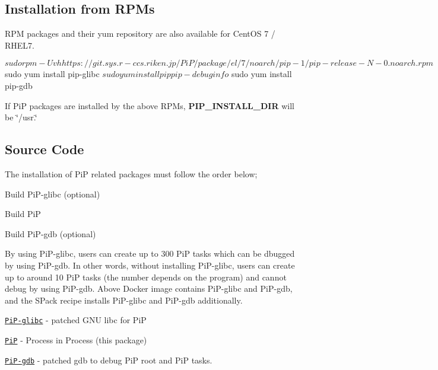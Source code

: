 \subsection*{Installation from R\-P\-Ms}

R\-P\-M packages and their yum repository are also available for Cent\-O\-S 7 / R\-H\-E\-L7. \begin{DoxyVerb}$ sudo rpm -Uvh https://git.sys.r-ccs.riken.jp/PiP/package/el/7/noarch/pip-1/pip-release-N-0.noarch.rpm
$ sudo yum install pip-glibc
$ sudo yum install pip pip-debuginfo
$ sudo yum install pip-gdb
\end{DoxyVerb}


If Pi\-P packages are installed by the above R\-P\-Ms, {\bfseries P\-I\-P\-\_\-\-I\-N\-S\-T\-A\-L\-L\-\_\-\-D\-I\-R} will be \char`\"{}/usr.\char`\"{}

\subsection*{Source Code}

The installation of Pi\-P related packages must follow the order below;


\begin{DoxyEnumerate}
\item Build Pi\-P-\/glibc (optional)
\item Build Pi\-P
\item Build Pi\-P-\/gdb (optional)
\end{DoxyEnumerate}

By using Pi\-P-\/glibc, users can create up to 300 Pi\-P tasks which can be dbugged by using Pi\-P-\/gdb. In other words, without installing Pi\-P-\/glibc, users can create up to around 10 Pi\-P tasks (the number depends on the program) and cannot debug by using Pi\-P-\/gdb. Above Docker image contains Pi\-P-\/glibc and Pi\-P-\/gdb, and the S\-Pack recipe installs Pi\-P-\/glibc and Pi\-P-\/gdb additionally.


\begin{DoxyItemize}
\item \href{https://github.com/RIKEN-SysSoft/PiP-glibc}{\tt Pi\-P-\/glibc} -\/ patched G\-N\-U libc for Pi\-P
\item \href{https://github.com/RIKEN-SysSoft/PiP}{\tt Pi\-P} -\/ Process in Process (this package)
\item \href{https://github.com/RIKEN-SysSoft/PiP-gdb}{\tt Pi\-P-\/gdb} -\/ patched gdb to debug Pi\-P root and Pi\-P tasks.
\end{DoxyItemize}

